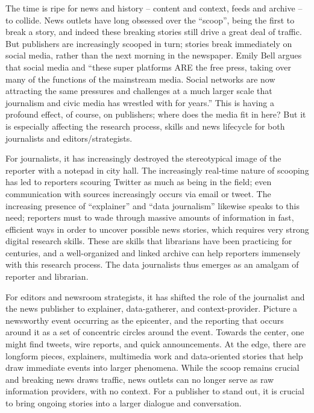 The time is ripe for news and history -- content and context, feeds and archive -- to collide. News outlets have long obsessed over the ``scoop'', being the first to break a story, and indeed these breaking stories still drive a great deal of traffic. But publishers are increasingly scooped in turn; stories break immediately on social media, rather than the next morning in the newspaper. %
Emily Bell argues that social media and ``these super platforms ARE the free press, taking over many of the functions of the mainstream media. Social networks are now attracting the same pressures and challenges at a much larger scale that journalism and civic media has wrestled with for years.''
This is having a profound effect, of course, on publishers; where does the media fit in here? But it is especially affecting the research process, skills and news lifecycle for both journalists and editors/strategists.

For journalists, it has increasingly destroyed the stereotypical image of the reporter with a notepad in city hall. The increasingly real-time nature of scooping has led to reporters scouring Twitter as much as being in the field; even communication with sources increasingly occurs via email or tweet. The increasing presence of ``explainer'' and ``data journalism'' likewise speaks to this need; reporters must to wade through massive amounts of information in fast, efficient ways in order to uncover possible news stories, which requires very strong digital research skills. These are skills that librarians have been practicing for centuries, and a well-organized and linked archive can help reporters immensely with this research process. The data journalists thus emerges as an amalgam of reporter and librarian.

For editors and newsroom strategists, it has shifted the role of the journalist and the news publisher to explainer, data-gatherer, and context-provider. Picture a newsworthy event occurring as the epicenter, and the reporting that occurs around it as a set of concentric circles around the event. Towards the center, one might find tweets, wire reports, and quick announcements. At the edge, there are longform pieces, explainers, multimedia work and data-oriented stories that help draw immediate events into larger phenomena. While the scoop remains crucial and breaking news draws traffic, news outlets can no longer serve as raw information providers, with no context. For a publisher to stand out, it is crucial to bring ongoing stories into a larger dialogue and conversation.

